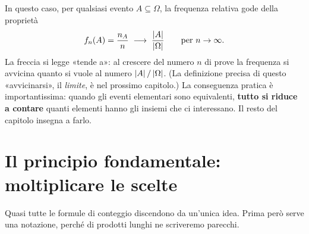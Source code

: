 
In questo caso, per qualsiasi evento $A \subseteq \Omega$, la frequenza relativa gode della proprietà
\[ f_n(A) = \frac{n_A}{n} \;\longrightarrow\; \frac{\left\lvert A \right\rvert}{\left\lvert \Omega \right\rvert} \qquad \text{per } n \to \infty . \]
La freccia si legge «tende a»: al crescere del numero $n$ di prove la frequenza si avvicina quanto si vuole al numero
$\left\lvert A \right\rvert / \left\lvert \Omega \right\rvert$. (La definizione precisa di questo «avvicinarsi», il \emph{limite}, è nel prossimo
capitolo.) La conseguenza pratica è importantissima: quando gli eventi elementari sono equivalenti, \textbf{tutto si
riduce a contare} quanti elementi hanno gli insiemi che ci interessano. Il resto del capitolo insegna a farlo.

\section{Il principio fondamentale: moltiplicare le scelte}

Quasi tutte le formule di conteggio discendono da un'unica idea. Prima però serve una notazione, perché di prodotti
lunghi ne scriveremo parecchi.

